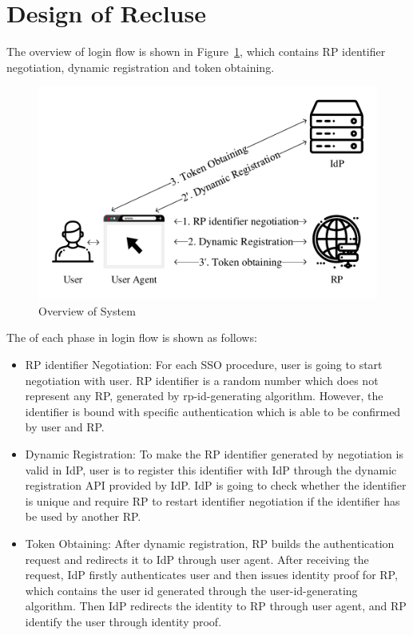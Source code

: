 \section{Design of Recluse}
\label{sec:protocol} 
The overview of login flow is shown in Figure~\ref{fig:overview}, which contains RP identifier negotiation, dynamic registration and token obtaining. 
\begin{figure}
  \centering
  \includegraphics[width=\linewidth]{fig/Overview.pdf}
  \caption{Overview of System}
  \label{fig:overview}
\end{figure}
The of each phase in login flow is shown as follows:
\begin{itemize}
\item[1.] RP identifier Negotiation: For each SSO procedure, user is going to start negotiation with user. RP identifier is a random number which does not represent any RP, generated by rp-id-generating algorithm. However, the identifier is bound with specific authentication which is able to be confirmed by user and RP.
\item[2.] Dynamic Registration: To make the RP identifier generated by negotiation is valid in IdP, user is to register this identifier with IdP through the dynamic registration API provided by IdP. IdP is going to check whether the identifier is unique and require RP to restart identifier negotiation if the identifier has be used by another RP.
\item[3.] Token Obtaining: After dynamic registration, RP builds the authentication request and redirects it to IdP through user agent. After receiving the request, IdP firstly authenticates user and then issues identity proof for RP, which contains the user id generated through the user-id-generating algorithm. Then IdP redirects the identity to RP through user agent, and RP identify the user through identity proof. 
\end{itemize}

